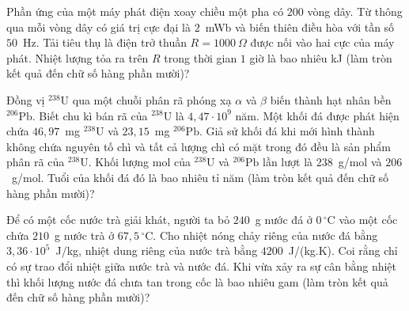 	\begin{ex}%
		Phần ứng của một máy phát điện xoay chiều một pha có $200$ vòng dây. Từ thông qua mỗi vòng dây có giá trị cực đại là $2$~mWb và biến thiên điều hòa với tần số $50$~Hz. Tải tiêu thụ là điện trở thuần $R=1000~\Omega$ được nối vào hai cực của máy phát. Nhiệt lượng tỏa ra trên $R$ trong thời gian $1$ giờ là bao nhiêu kJ (làm tròn kết quả đến chữ số hàng phần mười)?
		\par
	\end{ex}

	\begin{ex}%
		Đồng vị ${}^{238}\text{U}$ qua một chuỗi phân rã phóng xạ $\alpha$ và $\beta$ biến thành hạt nhân bền ${}^{206}\text{Pb}$. Biết chu kì bán rã của ${}^{238}\text{U}$ là $4{,}47\cdot 10^9$ năm. Một khối đá được phát hiện chứa $46{,}97$~mg ${}^{238}\text{U}$ và $23{,}15$~mg ${}^{206}\text{Pb}$. Giả sử khối đá khi mới hình thành không chứa nguyên tố chì và tất cả lượng chì có mặt trong đó đều là sản phẩm phân rã của ${}^{238}\text{U}$. Khối lượng mol của ${}^{238}\text{U}$ và ${}^{206}\text{Pb}$ lần lượt là $238$~g/mol và $206$~g/mol. Tuổi của khối đá đó là bao nhiêu tỉ năm (làm tròn kết quả đến chữ số hàng phần mười)?
		\par
	\end{ex}

	\begin{ex}%
		Để có một cốc nước trà giải khát, người ta bỏ $240$~g nước đá ở $0\,^\circ\text{C}$ vào một cốc chứa $210$~g nước trà ở $67{,}5\,^\circ\text{C}$. Cho nhiệt nóng chảy riêng của nước đá bằng $3{,}36\cdot 10^5$~J/kg, nhiệt dung riêng của nước trà bằng $4200$~J/(kg.K). Coi rằng chỉ có sự trao đổi nhiệt giữa nước trà và nước đá. Khi vừa xảy ra sự cân bằng nhiệt thì khối lượng nước đá chưa tan trong cốc là bao nhiêu gam (làm tròn kết quả đến chữ số hàng phần mười)?
		\par
	\end{ex}


